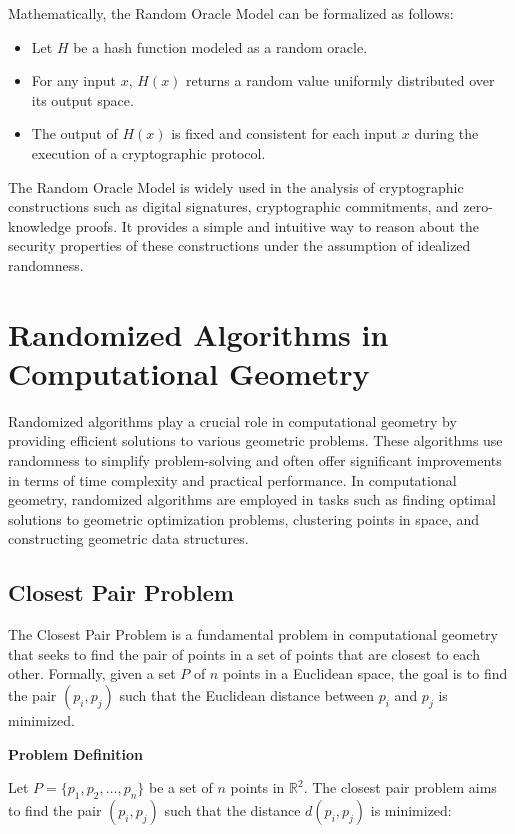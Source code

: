 \documentclass[12pt]{book} %
\begin{document}
Mathematically, the Random Oracle Model can be formalized as follows:
\begin{itemize}
    \item Let $H$ be a hash function modeled as a random oracle.
    \item For any input $x$, $H(x)$ returns a random value uniformly distributed over its output space.
    \item The output of $H(x)$ is fixed and consistent for each input $x$ during the execution of a cryptographic protocol.
\end{itemize}

The Random Oracle Model is widely used in the analysis of cryptographic constructions such as digital signatures, cryptographic commitments, and zero-knowledge proofs. It provides a simple and intuitive way to reason about the security properties of these constructions under the assumption of idealized randomness.


\section{Randomized Algorithms in Computational Geometry}

Randomized algorithms play a crucial role in computational geometry by providing efficient solutions to various geometric problems. These algorithms use randomness to simplify problem-solving and often offer significant improvements in terms of time complexity and practical performance. In computational geometry, randomized algorithms are employed in tasks such as finding optimal solutions to geometric optimization problems, clustering points in space, and constructing geometric data structures.

\subsection{Closest Pair Problem}

The Closest Pair Problem is a fundamental problem in computational geometry that seeks to find the pair of points in a set of points that are closest to each other. Formally, given a set \( P \) of \( n \) points in a Euclidean space, the goal is to find the pair \( (p_i, p_j) \) such that the Euclidean distance between \( p_i \) and \( p_j \) is minimized.

\textbf{Problem Definition}

Let \( P = \{ p_1, p_2, \ldots, p_n \} \) be a set of \( n \) points in \( \mathbb{R}^2 \). The closest pair problem aims to find the pair \( (p_i, p_j) \) such that the distance \( d(p_i, p_j) \) is minimized:
\end{document}
